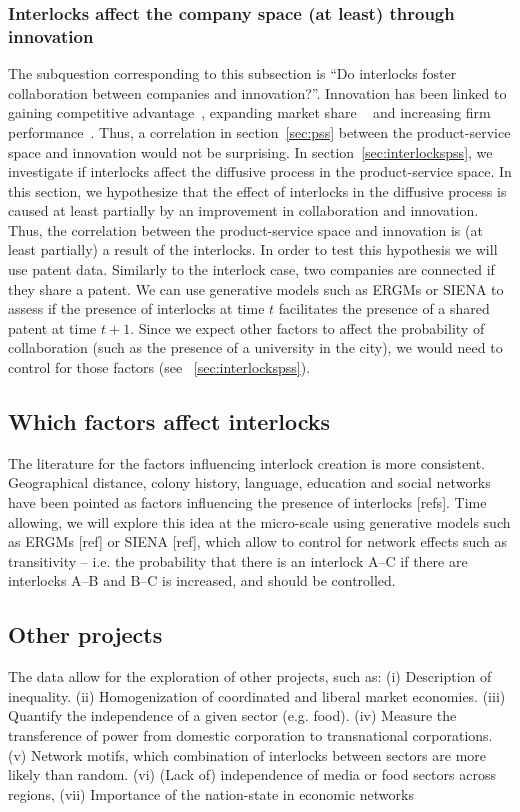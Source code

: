 \subsubsection{Interlocks affect the company space (at least) through innovation}
The subquestion corresponding to this subsection is ``Do interlocks foster collaboration between companies and innovation?''.
Innovation has been linked to gaining competitive advantage~\citep{Hitt1996}, expanding market share ~\citep{Franko1989} and increasing firm performance~\citep{Morbey1988}.
Thus, a correlation in section~\ref{sec:pss} between the product-service space and innovation would not be surprising. 
In section~\ref{sec:interlockspss}, we investigate if interlocks affect the diffusive process in the product-service space.
In this section, we hypothesize that the effect of interlocks in the diffusive process is caused at least partially by an improvement in collaboration and innovation.
Thus, the correlation between the product-service space and innovation is (at least partially) a result of the interlocks.
In order to test this hypothesis we will use patent data.
Similarly to the interlock case, two companies are connected if they share a patent.
We can use generative models such as ERGMs or SIENA to assess if the presence of interlocks at time $t$ facilitates the presence of a shared patent at time $t+1$. 
Since we expect other factors to affect the probability of collaboration (such as the presence of a university in the city),
we would need to control for those factors (see ~\ref{sec:interlockspss}).


\subsection{Which factors affect interlocks}
\label{sec:factors}
The literature for the factors influencing interlock creation is more consistent.
Geographical distance, colony history, language, education and social networks have been pointed as factors
influencing the presence of interlocks [refs].
Time allowing, we will explore this idea at the micro-scale using generative models such as ERGMs [ref] or SIENA [ref],
which allow to control for network effects such as transitivity -- i.e. the probability that there is an interlock A--C if there are interlocks A--B and B--C is increased, and should be controlled.


\subsection{Other projects}
The data allow for the exploration of other projects, such as:
(i) Description of inequality.
(ii) Homogenization of coordinated and liberal market economies.
(iii) Quantify the independence of a given sector (e.g. food).
(iv) Measure the transference of power from domestic corporation to transnational corporations.
(v) Network motifs, which combination of interlocks between sectors are more likely than random.
(vi) (Lack of) independence of media or food sectors across regions,
(vii) Importance of the nation-state in economic networks